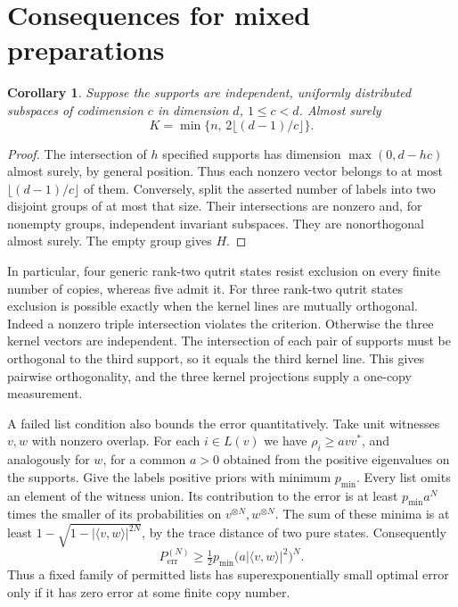 \documentclass[11pt,a4paper]{article}
\newtheorem{corollary}[theorem]{Corollary}
\theoremstyle{remark}
\begin{document}
\section{Consequences for mixed preparations}

\begin{corollary}\label{generic}
Suppose the supports are independent, uniformly distributed subspaces of codimension \(c\) in dimension \(d\), \(1\le c<d\). Almost surely
\[
                   K=\min\{n,\,2\lfloor(d-1)/c\rfloor\}.
\]
\end{corollary}
\begin{proof}
The intersection of \(h\) specified supports has dimension \(\max(0,d-hc)\) almost surely, by general position. Thus each nonzero vector belongs to at most \(\lfloor(d-1)/c\rfloor\) of them. Conversely, split the asserted number of labels into two disjoint groups of at most that size. Their intersections are nonzero and, for nonempty groups, independent invariant subspaces. They are nonorthogonal almost surely. The empty group gives \(H\).
\end{proof}

In particular, four generic rank-two qutrit states resist exclusion on every finite number of copies, whereas five admit it. For three rank-two qutrit states exclusion is possible exactly when the kernel lines are mutually orthogonal. Indeed a nonzero triple intersection violates the criterion. Otherwise the three kernel vectors are independent. The intersection of each pair of supports must be orthogonal to the third support, so it equals the third kernel line. This gives pairwise orthogonality, and the three kernel projections supply a one-copy measurement.

A failed list condition also bounds the error quantitatively. Take unit witnesses \(v,w\) with nonzero overlap. For each \(i\in L(v)\) we have \(\rho_i\ge a vv^*\), and analogously for \(w\), for a common \(a>0\) obtained from the positive eigenvalues on the supports. Give the labels positive priors with minimum \(p_{\min}\). Every list omits an element of the witness union. Its contribution to the error is at least \(p_{\min}a^N\) times the smaller of its probabilities on \(v^{\otimes N},w^{\otimes N}\). The sum of these minima is at least \(1-\sqrt{1-|\langle v,w\rangle|^{2N}}\), by the trace distance of two pure states. Consequently
\[
       P_{\mathrm{err}}^{(N)}\ge
       \tfrac12p_{\min}\bigl(a|\langle v,w\rangle|^2\bigr)^N .
\]
Thus a fixed family of permitted lists has superexponentially small optimal error only if it has zero error at some finite copy number.
\end{document}
